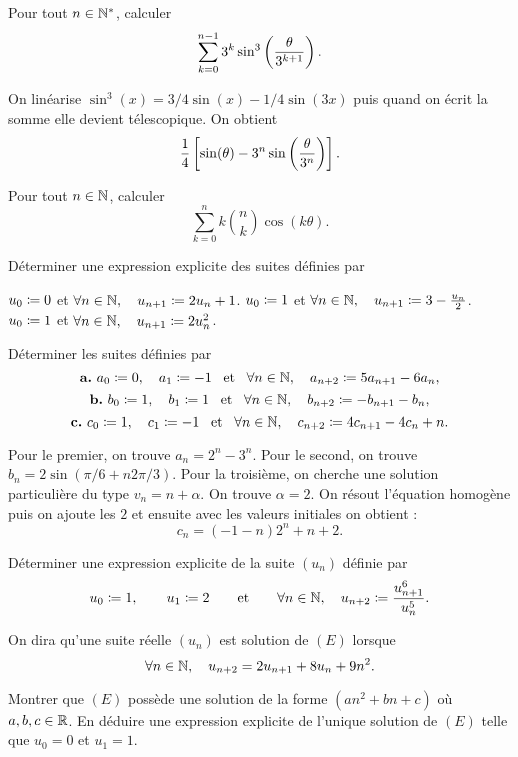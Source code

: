 \documentclass{magnolia}
\begin{document}
Pour tout $n\in{\mathbb{N}^*}$, calculer
\[\sum_{k=0}^{n-1} 3^k \sin^3 \left(\frac{\theta}{3^{k+1}}\right).\]

\begin{sol}
On linéarise $\sin^3(x)=3/4\sin(x)-1/4\sin(3x)$ puis quand on écrit la somme elle devient télescopique. On obtient
\[\frac{1}{4}\left[\sin(\theta)-3^n\sin\left(\frac{\theta}{3^n}\right)\right].\]
\end{sol}

Pour tout $n\in\mathbb{N}$, calculer
\[\sum_{k=0}^n k\binom{n}{k}\cos (k \theta).\]


Déterminer une expression explicite des suites définies par
\begin{questions}
\question $u_0\coloneqq 0$ et $\forall n\in\mathbb{N},\quad u_{n+1}\coloneqq 2 u_n+1$.
\question $u_0\coloneqq 1$ et $\forall n\in\mathbb{N},\quad u_{n+1}\coloneqq 3 - \frac{u_n}{2}$.
\question $u_0\coloneqq 1$ et $\forall n\in\mathbb{N},\quad u_{n+1}\coloneqq 2 u_n^2$.
\end{questions}



Déterminer les suites définies par
\[\textbf{a.}\ a_0\coloneqq 0,\quad a_1\coloneqq -1 \quad\!\text{et}\quad\! \forall n\in\mathbb{N},\quad a_{n + 2} \coloneqq 5a_{n + 1}-6a_n,\]
\[\textbf{b.}\ b_0\coloneqq 1,\quad b_1\coloneqq 1 \quad\!\text{et}\quad\! \forall n\in\mathbb{N},\quad b_{n + 2} \coloneqq -b_{n + 1}-b_n,\]
\[\textbf{c.}\ c_0\coloneqq 1,\quad c_1\coloneqq -1 \quad\!\text{et}\quad\! \forall n\in\mathbb{N},\quad c_{n + 2} \coloneqq 4c_{n + 1}-4c_n+n.\]

\begin{sol}
Pour le premier, on trouve $a_n=2^n-3^n$. Pour le second, on trouve $b_n=2\sin(\pi/6+n2\pi/3)$.
Pour la troisième, on cherche une solution particulière du type $v_n=n+\alpha$. On trouve $\alpha=2$. On résout l'équation homogène puis on ajoute les $2$ et ensuite avec les valeurs initiales on obtient :
$$c_n=(-1-n)2^n+n+2.$$
\end{sol}

Déterminer une expression explicite de la suite $(u_n)$ définie par
\[u_0\coloneqq 1,\qquad
  u_1\coloneqq 2\qquad\text{et}\qquad
  \forall n\in\mathbb{N},\quad u_{n+2}\coloneqq\frac{u_{n+1}^6}{u_n^5}.\]

On dira qu'une suite réelle $(u_n)$ est solution de $(E)$ lorsque
\[\forall n\in\mathbb{N},\quad u_{n+2}=2u_{n+1}+8u_n+9n^2.\]
\begin{questions}
\question Montrer que $(E)$ possède une solution de la forme $(an^2+bn+c)$ où $a,b,c\in\mathbb{R}$.
\question En déduire une expression explicite de l'unique solution de $(E)$ telle que $u_0=0$ et $u_1=1$.
\end{questions}
\end{document}
